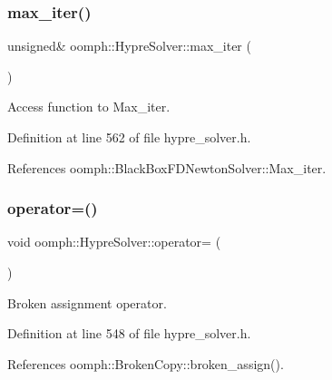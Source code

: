 \mbox{\label{classoomph_1_1HypreSolver_a1bc71b4c84ca568da53deea0a4fd8db0}} 
\subsubsection{\texorpdfstring{max\+\_\+iter()}{max\_iter()}}
{\footnotesize\ttfamily unsigned\& oomph\+::\+Hypre\+Solver\+::max\+\_\+iter (\begin{DoxyParamCaption}{ }\end{DoxyParamCaption})\hspace{0.3cm}{\ttfamily [inline]}}



Access function to Max\+\_\+iter. 



Definition at line 562 of file hypre\+\_\+solver.\+h.



References oomph\+::\+Black\+Box\+F\+D\+Newton\+Solver\+::\+Max\+\_\+iter.

\mbox{\label{classoomph_1_1HypreSolver_aae31cbdfcc5d0cd99849f94537b8331b}} 
\subsubsection{\texorpdfstring{operator=()}{operator=()}}
{\footnotesize\ttfamily void oomph\+::\+Hypre\+Solver\+::operator= (\begin{DoxyParamCaption}\item[{const \hyperlink{classoomph_1_1HypreSolver}{Hypre\+Solver} \&}]{ }\end{DoxyParamCaption})\hspace{0.3cm}{\ttfamily [inline]}}



Broken assignment operator. 



Definition at line 548 of file hypre\+\_\+solver.\+h.



References oomph\+::\+Broken\+Copy\+::broken\+\_\+assign().

